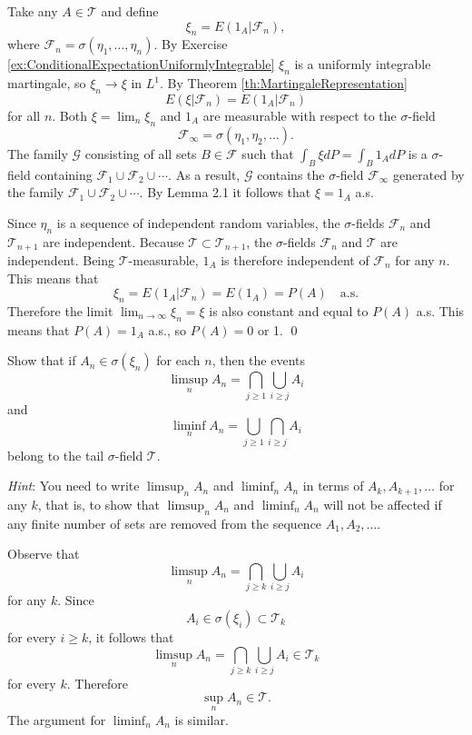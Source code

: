 \begin{Proof}
Take any $A \in \mathcal{T}$ and define
\[
\xi_{n} = E \left(1_{A} | \mathcal{F}_{n}\right),
\]
where $\mathcal{F}_n = \sigma (\eta_1,\dots ,\eta_n)$. By Exercise \ref{ex:ConditionalExpectationUniformlyIntegrable} $\xi_{n}$ is a uniformly integrable martingale, so $\xi_{n}\to \xi$ in $L^1$. By Theorem \ref{th:MartingaleRepresentation}
\[
E (\xi | \mathcal{F}_{n}) = E (1_{A} | \mathcal{F}_{n})
\]
for all $n$. Both $\xi = \lim_{n} \xi_n$ and $1_A$ are measurable with respect to the $\sigma$-field
\[
\mathcal{F}_{\infty} = \sigma (\eta_{1}, \eta_{2}, \dots).
\]
The family $\mathcal{G}$ consisting of all sets $B \in \mathcal{F}$ such that $\int_{B} \xi dP = \int_{B} 1_A dP$ is a $\sigma$-field containing $\mathcal{F}_1 \cup \mathcal{F}_2 \cup \cdots$. As a result, $\mathcal{G}$ contains the $\sigma$-field $\mathcal{F}_{\infty}$ generated by the family $\mathcal{F}_1 \cup \mathcal{F}_2 \cup \cdots$. By Lemma 2.1 it follows that $\xi = 1_A$ a.s.

Since $\eta_{n}$ is a sequence of independent random variables, the $\sigma$-fields $\mathcal{F}_{n}$ and $\mathcal{T}_{n+1}$ are independent. Because $\mathcal{T} \subset \mathcal{T}_{n+1}$, the $\sigma$-fields $\mathcal{F}_{n}$ and $\mathcal{T}$ are independent. Being $\mathcal{T}$-measurable, $1_{A}$ is therefore independent of $\mathcal{F}_{n}$ for any $n$. This means that
\[
\xi_{n} = E \left(1_{A} | \mathcal{F}_{n}\right) = E \left(1_{A}\right) = P (A) \quad \text{a.s.}
\]
Therefore the limit $\lim_{n\to \infty}\xi_n = \xi$ is also constant and equal to $P(A)$ a.s. This means that $P(A) = 1_A$ a.s., so $P(A) = 0$ or 1. \qed
\end{Proof}

\begin{Exercise}
\label{ex:TailSigmaFieldOfEvents}
Show that if $A_{n} \in \sigma(\xi_{n})$ for each $n$, then the events
\[
\limsup_{n} A_{n} = \bigcap_{j \geq 1} \bigcup_{i \geq j} A_{i}
\]
and
\[
\liminf_{n} A_{n} = \bigcup_{j \geq 1} \bigcap_{i \geq j} A_{i}
\]
belong to the tail $\sigma$-field $\mathcal{T}$.

\textit{Hint}: You need to write $\limsup_{n} A_n$ and $\liminf_{n} A_n$ in terms of $A_k, A_{k+1}, \ldots$ for any $k$, that is, to show that $\limsup_{n} A_n$ and $\liminf_{n} A_n$ will not be affected if any finite number of sets are removed from the sequence $A_1, A_2, \ldots$.
\end{Exercise}

\begin{Solution}
\label{sol:Exercise48}
Observe that
\[
\limsup_{n} A_{n} = \bigcap_{j \geq k} \bigcup_{i \geq j} A_{i}
\]
for any $k$. Since
\[
A_{i} \in \sigma (\xi_{i}) \subset \mathcal{T}_{k}
\]
for every $i \geq k$, it follows that
\[
\limsup_{n} A_{n} = \bigcap_{j \geq k} \bigcup_{i \geq j} A_{i} \in \mathcal{T}_{k}
\]
for every $k$. Therefore
\[
\sup_{n} A_{n} \in \mathcal{T}.
\]
The argument for $\liminf_{n} A_{n}$ is similar.
\end{Solution}


